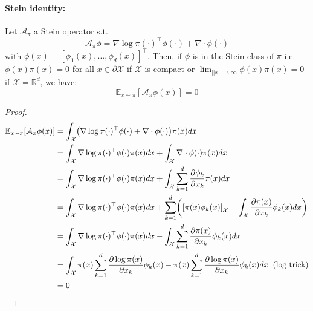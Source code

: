\documentclass[runningheads,a4paper]{llncs}
\newcommand{\R}{\mathbb{R}}
\newcommand{\E}{\mathbb{E}}
\newcommand{\X}{\mathcal{X}}
\newcommand{\A}{\mathcal{A}}
\newcommand{\diff}[2]{\frac{\partial #1}{\partial #2}}
\DeclarePairedDelimiter{\pare}{(}{)}
\DeclarePairedDelimiter{\sq}{[}{]}
\begin{document}
\paragraph{\bf Stein identity:}
Let $\A_\pi$ a Stein operator s.t.
$$
\A_\pi \phi = \nabla \log \pi(\cdot)^\top \phi(\cdot) + \nabla \cdot \phi(\cdot)
$$
with $\phi(x) = [\phi_1(x), ..., \phi_d(x)]^\top$.
Then, if $\phi$ is in the Stein class of $\pi$ i.e. $\phi(x)\pi(x) = 0$ for all $x \in \partial \X$
if $\X$ is compact or $\lim_{||x|| \to \infty} \phi(x) \pi(x) = 0$ if $\X = \R^d$, we have:
\begin{equation}
  \E_{x \sim \pi}[\A_\pi \phi (x)] = 0
  \label{eq:stein_id}
\end{equation}
\begin{proof}
  \begin{align*}
    \E_{x \sim \pi}[\A_\pi \phi (x)] &=
      \int_\X \pare*{ \nabla \log \pi(\cdot)^\top \phi(\cdot) + \nabla \cdot \phi(\cdot) } \pi(x) dx \\
    &= \int_\X \nabla \log \pi(\cdot)^\top \phi(\cdot) \pi(x) dx + \int_\X \nabla \cdot \phi(\cdot) \pi(x) dx \\
    &= \int_\X \nabla \log \pi(\cdot)^\top \phi(\cdot) \pi(x) dx +
      \int_\X \sum_{k=1}^d \diff{\phi_k}{x_k} \pi(x) dx \\
    &= \int_\X \nabla \log \pi(\cdot)^\top \phi(\cdot) \pi(x) dx +
    \sum_{k=1}^d \pare*{ \sq*{\pi(x) \phi_k(x)}_\X - \int_\X \diff{\pi(x)}{x_k} \phi_k(x) dx} \\
    &= \int_\X \nabla \log \pi(\cdot)^\top \phi(\cdot) \pi(x) dx -
      \int_\X \sum_{k=1}^d \diff{\pi(x)}{x_k} \phi_k(x) dx \\
    &= \int_\X  \pi(x) \sum_{k=1}^d \diff{\log \pi(x)}{x_k}\phi_k(x) -
    \pi(x) \sum_{k=1}^d \diff{\log \pi(x)}{x_k} \phi_k(x) dx \;\; \text{(log trick)} \\
    &= 0
  \end{align*}
\end{proof}
\end{document}
